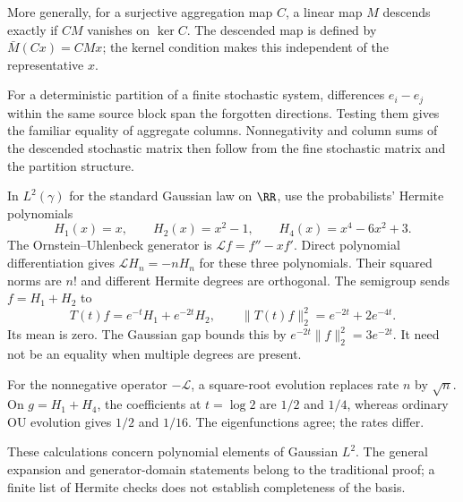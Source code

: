More generally, for a surjective aggregation map $C$, a linear map $M$ descends exactly if $CM$ vanishes on $\ker C$. The descended map is defined by $\bar M(Cx)=CMx$; the kernel condition makes this independent of the representative $x$.

For a deterministic partition of a finite stochastic system, differences $e_i-e_j$ within the same source block span the forgotten directions. Testing them gives the familiar equality of aggregate columns. Nonnegativity and column sums of the descended stochastic matrix then follow from the fine stochastic matrix and the partition structure.

In $L^2(\gamma)$ for the standard Gaussian law on $\RR$, use the probabilists' Hermite polynomials
\[
H_1(x)=x,\qquad H_2(x)=x^2-1,\qquad
H_4(x)=x^4-6x^2+3.
\]
The Ornstein--Uhlenbeck generator is $\mathcal Lf=f''-xf'$. Direct polynomial differentiation gives $\mathcal LH_n=-nH_n$ for these three polynomials. Their squared norms are $n!$ and different Hermite degrees are orthogonal.
The semigroup sends $f=H_1+H_2$ to
\[
T(t)f=e^{-t}H_1+e^{-2t}H_2,\qquad
\|T(t)f\|_2^2=e^{-2t}+2e^{-4t}.
\]
Its mean is zero. The Gaussian gap bounds this by $e^{-2t}\|f\|_2^2=3e^{-2t}$. It need not be an equality when multiple degrees are present.

For the nonnegative operator $-\mathcal L$, a square-root evolution replaces rate $n$ by $\sqrt n$. On $g=H_1+H_4$, the coefficients at $t=\log2$ are $1/2$ and $1/4$, whereas ordinary OU evolution gives $1/2$ and $1/16$. The eigenfunctions agree; the rates differ.

These calculations concern polynomial elements of Gaussian $L^2$. The general expansion and generator-domain statements belong to the traditional proof; a finite list of Hermite checks does not establish completeness of the basis.


